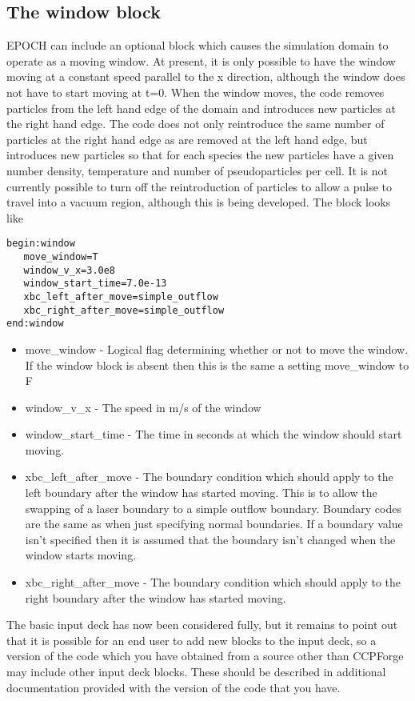 \documentclass[12pt]{article}
\newcommand{\simpleboxverbatim}{\begin{Verbatim}[obeytabs=true,frame=single,
  framerule=0.5mm,rulecolor=\color{warwickmid}]}
\newcommand{\EPOCH}{{\color{warwickdark}\fontfamily{phv}\selectfont EPOCH} }
\begin{document}
\subsection{The window block}
\EPOCH can include an optional block which causes the simulation domain to
operate as a moving window. At present, it is only possible to have the window
moving at a constant speed parallel to the x direction, although the window
does not have to start moving at t=0. When the window moves, the code removes
particles from the left hand edge of the domain and introduces new particles
at the right hand edge. The code does not only reintroduce the same number of
particles at the right hand edge as are removed at the left hand edge, but
introduces new particles so that for each species the new particles have a
given number density, temperature and number of pseudoparticles per cell. It
is not currently possible to turn off the reintroduction of particles to allow
a pulse to travel into a vacuum region, although this is being developed. The
block looks like\\
\simpleboxverbatim
begin:window
   move_window=T
   window_v_x=3.0e8
   window_start_time=7.0e-13
   xbc_left_after_move=simple_outflow
   xbc_right_after_move=simple_outflow
end:window
\end{Verbatim}

\begin{itemize}
\item move\_window - Logical flag determining whether or not to move the
  window. If the window block is absent then this is the same a setting
  move\_window to F
\item window\_v\_x - The speed in m/s of the window
\item window\_start\_time - The time in seconds at which the window should
  start moving.
\item xbc\_left\_after\_move - The boundary condition which should apply to
  the left boundary after the window has started moving. This is to allow the
  swapping of a laser boundary to a simple outflow boundary. Boundary codes
  are the same as when just specifying normal boundaries. If a boundary value
  isn't specified then it is assumed that the boundary isn't changed when the
  window starts moving.
\item xbc\_right\_after\_move - The boundary condition which should apply to
  the right boundary after the window has started moving.
\end{itemize}

The basic input deck has now been considered fully, but it remains to point
out that it is possible for an end user to add new blocks to the input deck,
so a version of the code which you have obtained from a source other than
CCPForge may include other input deck blocks. These should be described in
additional documentation provided with the version of the code that you have.
\end{document}
